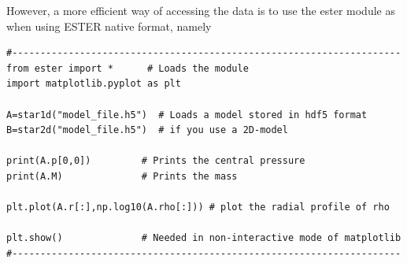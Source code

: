 However, a more efficient way of accessing the data is to use the ester module
as when using ESTER native format, namely

\begin{verbatim}
#---------------------------------------------------------------------
from ester import *      # Loads the module
import matplotlib.pyplot as plt

A=star1d("model_file.h5")  # Loads a model stored in hdf5 format
B=star2d("model_file.h5")  # if you use a 2D-model

print(A.p[0,0])         # Prints the central pressure
print(A.M)              # Prints the mass

plt.plot(A.r[:],np.log10(A.rho[:])) # plot the radial profile of rho

plt.show()              # Needed in non-interactive mode of matplotlib
#---------------------------------------------------------------------
\end{verbatim}



